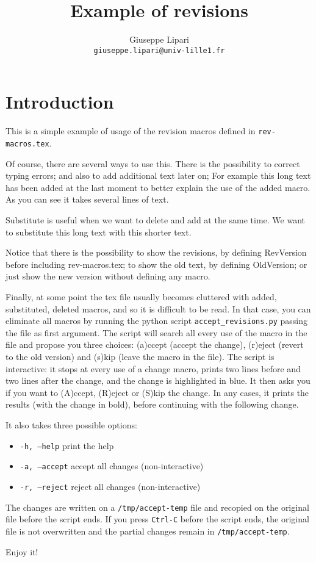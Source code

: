\documentclass{article}
\title{Example of revisions}
\author{Giuseppe Lipari\\\texttt{giuseppe.lipari@univ-lille1.fr}}
\begin{document}
\maketitle

\section{Introduction}

This is a simple example of usage of the revision
macros defined in \texttt{rev-macros.tex}. 

Of course, there are several ways to use this. There is the
possibility to correct typing errors; and also to add
additional text later on; For example this long text has been
  added at the last moment to better explain the use of the added
  macro. As you can see it takes several lines of text.

Substitute is useful when we want to delete and add at the same
time. We want to substitute this long text with this shorter text.

Notice that there is the possibility to show the revisions, by
  defining RevVersion before including rev-macros.tex; to show the
old text, by defining OldVersion; or just show the new
version without defining any macro.

Finally, at some point the tex file usually becomes cluttered with
added, substituted, deleted macros, and so it is difficult to be
read. In that case, you can eliminate all macros by running the
python script \texttt{accept\_revisions.py} passing the file
as first argument. The script will search all every use of the macro
in the file and propose you three choices: (a)ccept (accept the
  change), (r)eject (revert to the old version) and (s)kip
(leave the macro in the file). 
The script is interactive: it stops at every use of a change macro,
prints two lines before and two lines after the change, and the change
is highlighted in blue. It then asks you if you want to (A)ccept,
(R)eject or (S)kip the change. In any cases, it prints the results
(with the change in bold), before continuing with the following change.

It also takes three possible options:

\begin{itemize}
\item \texttt{-h, --help} print the help 

\item \texttt{-a, --accept} accept all changes
  (non-interactive) 
\item \texttt{-r, --reject} reject all changes (non-interactive)
\end{itemize}
The changes are written on a \texttt{/tmp/accept-temp} file and
recopied on the original file before the script ends. If you press
\texttt{Ctrl-C} before the script ends, the original file is not
overwritten and the partial changes remain in
\texttt{/tmp/accept-temp}.

Enjoy it! 
\end{document}
